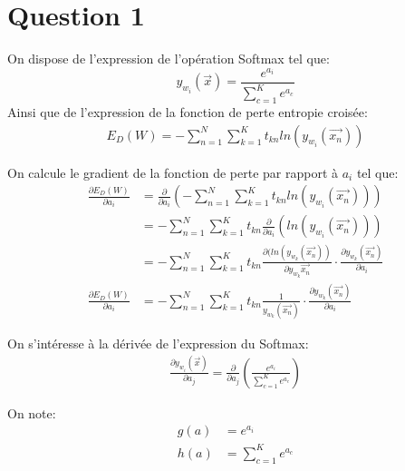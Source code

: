 \section{Question 1}
On dispose de l'expression de l'opération Softmax tel que:
\begin{equation}	
	y_{w_i}(\overrightarrow{x}) = \frac{e^{a_i}}{\sum_{c=1}^Ke^{a_c}}
\end{equation}
Ainsi que de l'expression de la fonction de perte entropie croisée:
\begin{equation}
\begin{split}
	E_D(W) = - \sum_{n=1}^N \sum_{k=1}^K t_{kn} ln (y_{w_i} (\overrightarrow{x_n}))
\end{split}
\end{equation}

On calcule le gradient de la fonction de perte par rapport à $a_i$ tel que:
\begin{equation}
\begin{split}
	\frac{\partial E_D(W)}{\partial a_i}  &= \frac{\partial}{\partial a_i} \left(-\sum_{n=1}^N \sum_{k=1}^K t_{kn} ln (y_{w_i} (\overrightarrow{x_n})) \right) \\
	&= -\sum_{n=1}^N \sum_{k=1}^K t_{kn} \frac{\partial}{\partial a_i} \left(ln (y_{w_i} (\overrightarrow{x_n})) \right) \\
	&= -\sum_{n=1}^N \sum_{k=1}^K t_{kn} \frac{\partial(ln(y_{w_k}(\overrightarrow{x_n}))}{\partial y_{w_k} \overrightarrow{x_n}} \cdot \frac{\partial y_{w_k} (\overrightarrow{x_n})}{\partial a_i} \\
	\frac{\partial E_D(W)}{\partial a_i}  &= -\sum_{n=1}^N \sum_{k=1}^K t_{kn} \frac{1}{y_{w_k} (\overrightarrow{x_n})} \cdot \frac{\partial y_{w_k} (\overrightarrow{x_n})}{\partial a_i}
\end{split}
\end{equation}

On s'intéresse à la dérivée de l'expression du Softmax:
\begin{equation}
\begin{split}
	\frac{\partial y_{w_i}(\overrightarrow{x})}{\partial a_j} = \frac{\partial}{\partial a_j} \left( \frac{e^{a_i}}{\sum_{c=1}^Ke^{a_c}} \right)
\end{split}
\end{equation}

On note:
\begin{equation}
\begin{split}
	g(a) &= e^{a_i} \\
	h(a) &= \sum_{c=1}^Ke^{a_c}
\end{split}
\end{equation}


